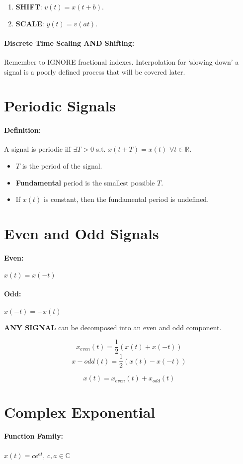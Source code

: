 \documentclass[a4paper,12pt]{report}
\def\reals{\mathbb{R}}
\begin{document}
\begin{enumerate}
\item \textbf{SHIFT}: $v(t) = x(t+b)$.
\item \textbf{SCALE}: $y(t) = v(at)$.
\end{enumerate}

\paragraph{Discrete Time Scaling AND Shifting: } Remember to IGNORE fractional indexes. Interpolation for `slowing down' a signal is a poorly defined process that will be covered later.

\section{Periodic Signals}

\paragraph{Definition: } A signal is periodic iff $\exists T > 0$ s.t. $x(t+T) = x(t)$ $\forall t\in\reals$. 

\begin{itemize}
\item $T$ is the period of the signal.
\item \textbf{Fundamental} period is the smallest possible $T$.
\item If $x(t)$ is constant, then the fundamental period is undefined.
\end{itemize}

\section{Even and Odd Signals}

\paragraph{Even: } $x(t) = x(-t)$
\paragraph{Odd: } $x(-t) = -x(t)$

\textbf{ANY SIGNAL} can be decomposed into an even and odd component.

$$x_{even}(t) = \frac{1}{2} (x(t) + x(-t))$$
$$x-{odd}(t) = \frac{1}{2} (x(t) - x(-t))$$

$$x(t) = x_{even}(t) + x_{odd}(t)$$


\section{Complex Exponential}
\paragraph{Function Family: } $x(t) = c e^{at}$, $c, a\in \mathbb{C}$

\subsection{}
\end{document}
